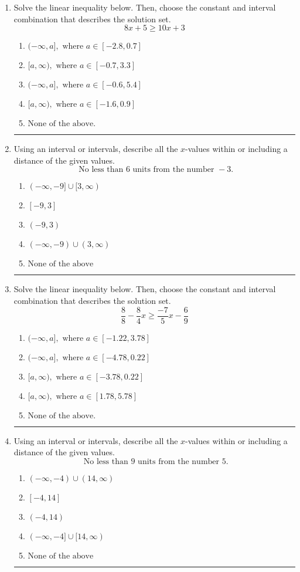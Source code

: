 \documentclass[14pt]{extbook}
\newcommand{\litem}[1]{\item#1\hspace*{-1cm}\rule{\textwidth}{0.4pt}}
\begin{document}
\begin{enumerate}
{\begin{enumerate}[label=\Alph*.]
\end{enumerate} }
\litem{
Solve the linear inequality below. Then, choose the constant and interval combination that describes the solution set.\[ 8x + 5 \geq 10x + 3 \]\begin{enumerate}[label=\Alph*.]
\item \( (-\infty, a], \text{ where } a \in [-2.8, 0.7] \)
\item \( [a, \infty), \text{ where } a \in [-0.7, 3.3] \)
\item \( (-\infty, a], \text{ where } a \in [-0.6, 5.4] \)
\item \( [a, \infty), \text{ where } a \in [-1.6, 0.9] \)
\item \( \text{None of the above}. \)

\end{enumerate} }
\litem{
Using an interval or intervals, describe all the $x$-values within or including a distance of the given values.\[ \text{ No less than } 6 \text{ units from the number } -3. \]\begin{enumerate}[label=\Alph*.]
\item \( (-\infty, -9] \cup [3, \infty) \)
\item \( [-9, 3] \)
\item \( (-9, 3) \)
\item \( (-\infty, -9) \cup (3, \infty) \)
\item \( \text{None of the above} \)

\end{enumerate} }
\litem{
Solve the linear inequality below. Then, choose the constant and interval combination that describes the solution set.\[ \frac{8}{8} - \frac{8}{4} x \geq \frac{-7}{5} x - \frac{6}{9} \]\begin{enumerate}[label=\Alph*.]
\item \( (-\infty, a], \text{ where } a \in [-1.22, 3.78] \)
\item \( (-\infty, a], \text{ where } a \in [-4.78, 0.22] \)
\item \( [a, \infty), \text{ where } a \in [-3.78, 0.22] \)
\item \( [a, \infty), \text{ where } a \in [1.78, 5.78] \)
\item \( \text{None of the above}. \)

\end{enumerate} }
\litem{
Using an interval or intervals, describe all the $x$-values within or including a distance of the given values.\[ \text{ No less than } 9 \text{ units from the number } 5. \]\begin{enumerate}[label=\Alph*.]
\item \( (-\infty, -4) \cup (14, \infty) \)
\item \( [-4, 14] \)
\item \( (-4, 14) \)
\item \( (-\infty, -4] \cup [14, \infty) \)
\item \( \text{None of the above} \)


\end{enumerate}}
\end{enumerate}
\end{document}
